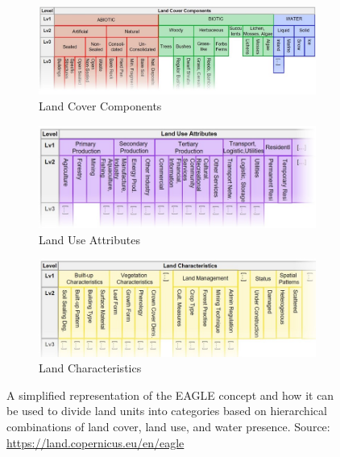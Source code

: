         

        \begin{figure}[H]
        \centering
        \begin{subfigure}[b]{0.85\textwidth}
        \centering
        \includegraphics[width=\linewidth,height=0.4\linewidth]{figs_06/eagle_landcover.png}
        \caption{Land Cover Components}
        \label{fig:eagle_landcover}
        \end{subfigure}
        \vspace{1em}
        \begin{subfigure}[b]{0.85\textwidth}
        \centering
        \includegraphics[width=\linewidth,height=0.4\linewidth]{figs_06/eagle_landuse.png}
        \caption{Land Use Attributes}
        \label{fig:eagle_landuse}
        \end{subfigure}
        \vspace{1em}
        \begin{subfigure}[b]{0.85\textwidth}
        \centering
        \includegraphics[width=\linewidth,height=0.4\linewidth]{figs_06/eagle_landcharacteristics.png}
        \caption{Land Characteristics}
        \label{fig:eagle_landcharacteristics}
        \end{subfigure}
        
        \caption{A simplified representation of the EAGLE concept and how it can be used to divide land units into categories based on hierarchical combinations of land cover, land use, and water presence. Source: \url{https://land.copernicus.eu/en/eagle}}
        \label{fig:eagle} %
        \end{figure}

